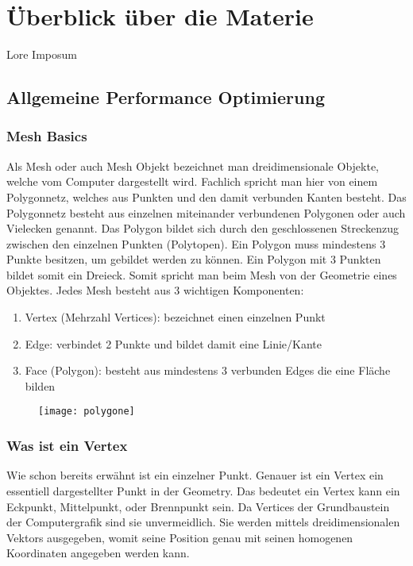 \chapter{Überblick über die Materie}

Lore Imposum

\section{Allgemeine Performance Optimierung}

\subsection{Mesh Basics}

Als Mesh oder auch Mesh Objekt bezeichnet man dreidimensionale Objekte, welche vom Computer dargestellt wird. Fachlich spricht man hier von einem Polygonnetz, welches aus Punkten und den damit verbunden Kanten besteht. Das Polygonnetz besteht aus einzelnen miteinander verbundenen Polygonen oder auch Vielecken genannt. Das Polygon bildet sich durch den geschlossenen Streckenzug zwischen den einzelnen Punkten (Polytopen). Ein Polygon muss mindestens 3 Punkte besitzen, um gebildet werden zu können. Ein Polygon mit 3 Punkten bildet somit ein Dreieck. Somit spricht man beim Mesh von der Geometrie eines Objektes. Jedes Mesh besteht aus 3 wichtigen Komponenten:
\begin{enumerate}[]
	\item Vertex (Mehrzahl Vertices): bezeichnet einen einzelnen Punkt
	\item Edge: verbindet 2 Punkte und bildet damit eine Linie/Kante
	\item Face (Polygon): besteht aus mindestens 3 verbunden Edges die eine Fläche bilden
\end{enumerate}

\begin{figure}[H]
	\centering
	\texttt{[image: polygone]}
	\caption{\cite{_polygons}}
\end{figure}

\subsection{Was ist ein Vertex}

Wie schon bereits erwähnt ist ein einzelner Punkt. Genauer ist ein Vertex ein essentiell dargestellter Punkt in der Geometry. Das bedeutet ein Vertex kann ein Eckpunkt, Mittelpunkt, oder Brennpunkt sein. Da Vertices der Grundbaustein der Computergrafik sind sie unvermeidlich. Sie werden mittels dreidimensionalen Vektors ausgegeben, womit seine Position genau mit seinen homogenen Koordinaten angegeben werden kann.

